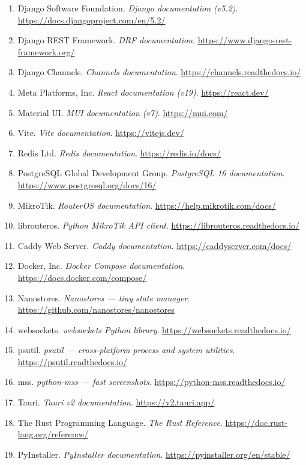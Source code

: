 \documentclass[12pt, a4paper, twoside]{article}
\begin{document}
\begin{enumerate}
  \item Django Software Foundation. \textit{Django documentation (v5.2)}. \url{https://docs.djangoproject.com/en/5.2/}
  \item Django REST Framework. \textit{DRF documentation}. \url{https://www.django-rest-framework.org/}
  \item Django Channels. \textit{Channels documentation}. \url{https://channels.readthedocs.io/}
  \item Meta Platforms, Inc. \textit{React documentation (v19)}. \url{https://react.dev/}
  \item Material UI. \textit{MUI documentation (v7)}. \url{https://mui.com/}
  \item Vite. \textit{Vite documentation}. \url{https://vitejs.dev/}
  \item Redis Ltd. \textit{Redis documentation}. \url{https://redis.io/docs/}
  \item PostgreSQL Global Development Group. \textit{PostgreSQL 16 documentation}. \url{https://www.postgresql.org/docs/16/}
  \item MikroTik. \textit{RouterOS documentation}. \url{https://help.mikrotik.com/docs/}
  \item librouteros. \textit{Python MikroTik API client}. \url{https://librouteros.readthedocs.io/}
  \item Caddy Web Server. \textit{Caddy documentation}. \url{https://caddyserver.com/docs/}
  \item Docker, Inc. \textit{Docker Compose documentation}. \url{https://docs.docker.com/compose/}
  \item Nanostores. \textit{Nanostores — tiny state manager}. \url{https://github.com/nanostores/nanostores}
  \item websockets. \textit{websockets Python library}. \url{https://websockets.readthedocs.io/}
  \item psutil. \textit{psutil — cross-platform process and system utilities}. \url{https://psutil.readthedocs.io/}
  \item mss. \textit{python-mss — fast screenshots}. \url{https://python-mss.readthedocs.io/}
  \item Tauri. \textit{Tauri v2 documentation}. \url{https://v2.tauri.app/}
  \item The Rust Programming Language. \textit{The Rust Reference}. \url{https://doc.rust-lang.org/reference/}
  \item PyInstaller. \textit{PyInstaller documentation}. \url{https://pyinstaller.org/en/stable/}
\end{enumerate}
\end{document}
